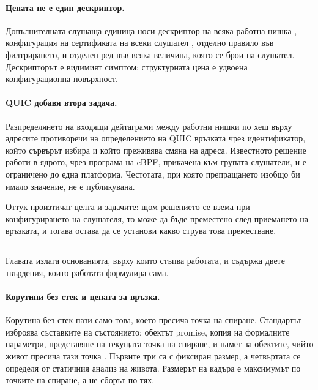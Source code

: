 \paragraph{Цената не е един дескриптор.} Допълнителната слушаща единица носи дескриптор на
всяка работна нишка \cite{nginxlisten}, конфигурация на сертификата на всеки слушател
\cite{h2olisten, drogonconfig}, отделно правило във филтрирането, и отделен ред във всяка
величина, която се брои на слушател. Дескрипторът е видимият симптом; структурната цена е
удвоена конфигурационна повърхност.

\paragraph{QUIC добавя втора задача.} Разпределянето на входящи дейтаграми между работни нишки
по хеш върху адресите противоречи на определението на QUIC връзката чрез идентификатор, който
сървърът избира и който преживява смяна на адреса. Известното решение работи в ядрото, чрез
програма на eBPF, прикачена към групата слушатели, и е ограничено до една платформа.
Честотата, при която препращането изобщо би имало значение, не е публикувана.

Оттук произтичат целта и задачите: щом решението се взема при конфигурирането на слушателя,
то може да бъде преместено след приемането на връзката, и тогава остава да се установи какво
струва това преместване.

\subsection*{}

Главата излага основанията, върху които стъпва работата, и съдържа двете твърдения, които
работата формулира сама.

\paragraph{Корутини без стек и цената за връзка.} Корутина без стек пази само това, което
пресича точка на спиране. Стандартът изброява съставките на състоянието: обектът promise,
копия на формалните параметри, представяне на текущата точка на спиране, и памет за
обектите, чийто живот пресича тази точка \cite{cpp20standard}. Първите три са с фиксиран
размер, а четвъртата се определя от статичния анализ на живота. Размерът на кадъра е
максимумът по точките на спиране, а не сборът по тях.

